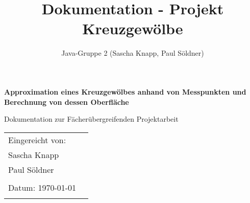\documentclass[11pt, bibliography=totocnumbered]{scrartcl}
\title{Dokumentation - Projekt Kreuzgew\"olbe}
\author{Java-Gruppe 2 (Sascha Knapp, Paul S\"oldner)}
\begin{document}
	\begin{titlepage}
		\begin{center}
			\vspace*{2cm}
			
			\huge
			\textbf{Approximation eines Kreuzgew\"olbes anhand von Messpunkten und Berechnung von dessen Oberfl\"ache}
			
			\vspace{1.5cm}
			\LARGE
			Dokumentation zur F\"acher\"ubergreifenden Projektarbeit
		\end{center}    
		\vspace{1cm}
		
		\vfill{}
		\large
		\begin{tabular}{@{}l l}
			Eingereicht von: & \\
			Sascha Knapp \\
			Paul S\"oldner \\
			\\
			Datum: \today \\
			\\
		\end{tabular}
		\vfill
	\end{titlepage}
\newpage
\tableofcontents
\newpage
\end{document}
